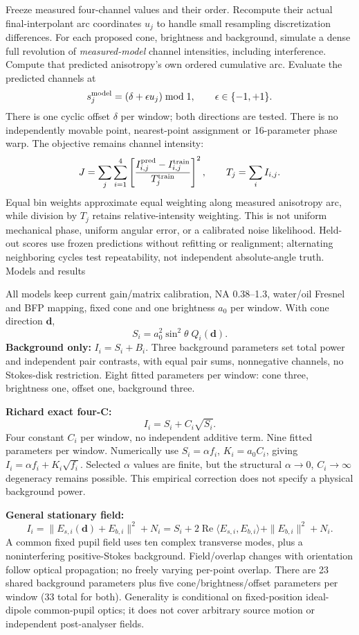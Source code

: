 \documentclass[10pt,a4paper]{article}
\begin{document}
Freeze measured four-channel values and their order. Recompute their actual final-interpolant arc coordinates $u_j$ to handle small resampling discretization differences. For each proposed cone, brightness and background, simulate a dense full revolution of \emph{measured-model} channel intensities, including interference. Compute that predicted anisotropy's own ordered cumulative arc. Evaluate the predicted channels at
\[
s_j^{\rm model}=(\delta+\epsilon u_j)\bmod1,\qquad \epsilon\in\{-1,+1\}.
\]
There is one cyclic offset $\delta$ per window; both directions are tested. There is no independently movable point, nearest-point assignment or 16-parameter phase warp. The objective remains channel intensity:
\[
J=\sum_j\sum_{i=1}^4\left[\frac{I^{\rm pred}_{i,j}-I^{\rm train}_{i,j}}{T_j^{\rm train}}\right]^2,
\qquad T_j=\sum_i I_{i,j}.
\]
Equal bin weights approximate equal weighting along measured anisotropy arc, while division by $T_j$ retains relative-intensity weighting. This is not uniform mechanical phase, uniform angular error, or a calibrated noise likelihood. Held-out scores use frozen predictions without refitting or realignment; alternating neighboring cycles test repeatability, not independent absolute-angle truth.
\newpage
{\Large Models and results}

All models keep current gain/matrix calibration, NA 0.38--1.3, water/oil Fresnel and BFP mapping, fixed cone and one brightness $a_0$ per window. With cone direction $\mathbf d$,
\[
S_i=a_0^2\sin^2\theta\;Q_i(\mathbf d).
\]
\textbf{Background only:} $I_i=S_i+B_i$. Three background parameters set total power and independent pair contrasts, with equal pair sums, nonnegative channels, no Stokes-disk restriction. Eight fitted parameters per window: cone three, brightness one, offset one, background three.

\textbf{Richard exact four-C:}
\[
I_i=S_i+C_i\sqrt{S_i}.
\]
Four constant $C_i$ per window, no independent additive term. Nine fitted parameters per window. Numerically use $S_i=\alpha f_i$, $K_i=a_0C_i$, giving $I_i=\alpha f_i+K_i\sqrt{f_i}$. Selected $\alpha$ values are finite, but the structural $\alpha\to0$, $C_i\to\infty$ degeneracy remains possible. This empirical correction does not specify a physical background power.

\textbf{General stationary field:}
\[
I_i=\|E_{s,i}(\mathbf d)+E_{b,i}\|^2+N_i
=S_i+2\operatorname{Re}\langle E_{s,i},E_{b,i}\rangle+\|E_{b,i}\|^2+N_i.
\]
A common fixed pupil field uses ten complex transverse modes, plus a noninterfering positive-Stokes background. Field/overlap changes with orientation follow optical propagation; no freely varying per-point overlap. There are 23 shared background parameters plus five cone/brightness/offset parameters per window (33 total for both). Generality is conditional on fixed-position ideal-dipole common-pupil optics; it does not cover arbitrary source motion or independent post-analyser fields.
\end{document}
